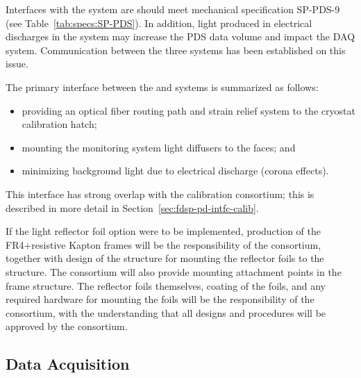 
Interfaces with the  system are should meet mechanical specification SP-PDS-9 (see Table~\ref{tab:specs:SP-PDS}). In addition, light produced in electrical discharges in the  system may increase the PDS data volume and impact the DAQ system. Communication between the three systems has been established on this issue. 

The primary interface between the  and  systems is summarized as follows:
\begin{itemize}
    \item providing an optical fiber routing path and strain relief system to the cryostat calibration hatch;
    \item mounting the  monitoring system light diffusers to the  faces; and     
    \item minimizing background light due to electrical discharge (corona effects).
\end{itemize} 


This interface has strong overlap with the calibration consortium; this is described in more detail in Section~\ref{sec:fdsp-pd-intfc-calib}.

If the light reflector foil option were to be implemented, production of the FR4+resistive Kapton  frames will be the responsibility of the  consortium, together with design of the structure for mounting the  reflector foils to the  structure.  The  consortium will also provide mounting attachment points in the  frame structure.
 The reflector foils themselves,  coating of the  foils, and any required hardware for mounting the foils will be the responsibility of the  consortium, with the understanding that all designs and procedures will be approved by the  consortium. 


\subsection{Data Acquisition}
\label{sec:fdsp-pd-intfc-daq}

